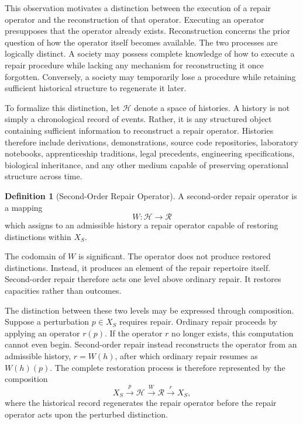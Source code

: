 \documentclass[12pt,oneside]{article}
\theoremstyle{plain}
\theoremstyle{definition}
\newtheorem{definition}[theorem]{Definition}
\theoremstyle{remark}
\theoremstyle{plain}
\newcommand{\Hist}{\mathcal{H}}
\begin{document}
This observation motivates a distinction between the execution of a repair operator and the
reconstruction of that operator. Executing an operator presupposes that the operator already exists.
Reconstruction concerns the prior question of how the operator itself becomes available. The two
processes are logically distinct. A society may possess complete knowledge of how to execute a
repair procedure while lacking any mechanism for reconstructing it once forgotten. Conversely, a
society may temporarily lose a procedure while retaining sufficient historical structure to
regenerate it later.

To formalize this distinction, let $\Hist$ denote a space of histories. A history is not simply a
chronological record of events. Rather, it is any structured object containing sufficient
information to reconstruct a repair operator. Histories therefore include derivations,
demonstrations, source code repositories, laboratory notebooks, apprenticeship traditions, legal
precedents, engineering specifications, biological inheritance, and any other medium capable of
preserving operational structure across time.

\begin{definition}[Second-Order Repair Operator]
A second-order repair operator is a mapping
\[
W : \Hist \rightarrow \mathcal{R}
\]
which assigns to an admissible history a repair operator capable of restoring distinctions within
$X_S$.
\end{definition}

The codomain of $W$ is significant. The operator does not produce restored distinctions. Instead,
it produces an element of the repair repertoire itself. Second-order repair therefore acts one
level above ordinary repair. It restores capacities rather than outcomes.

The distinction between these two levels may be expressed through composition. Suppose a
perturbation $p \in X_S$ requires repair. Ordinary repair proceeds by applying an operator $r(p)$.
If the operator $r$ no longer exists, this computation cannot even begin. Second-order repair
instead reconstructs the operator from an admissible history, $r = W(h)$, after which ordinary
repair resumes as $W(h)(p)$. The complete restoration process is therefore represented by the
composition
\[
X_S
\overset{p}{\longrightarrow}
\Hist
\overset{W}{\longrightarrow}
\mathcal{R}
\overset{r}{\longrightarrow}
X_S,
\]
where the historical record regenerates the repair operator before the repair operator acts upon
the perturbed distinction.
\end{document}
